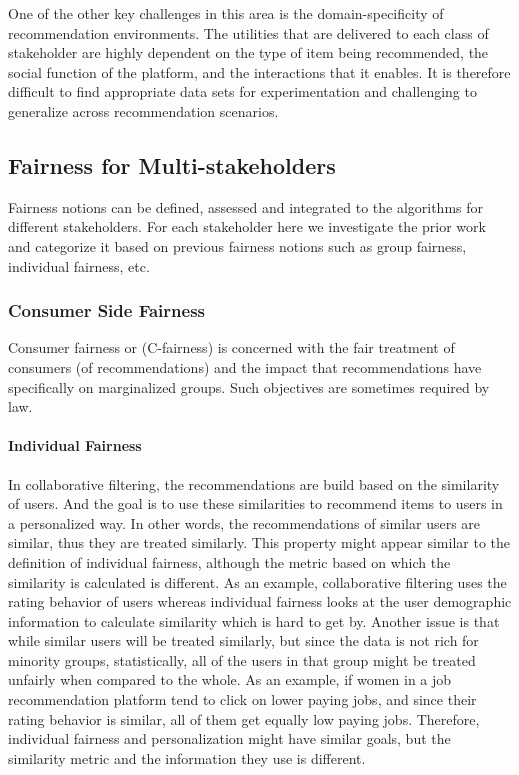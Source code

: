 One of the other key challenges in this area is the domain-specificity of recommendation environments. The utilities that are delivered to each class of stakeholder are highly dependent on the type of item being recommended, the social function of the platform, and the interactions that it enables. It is therefore difficult to find appropriate data sets for experimentation and challenging to generalize across recommendation scenarios.

\subsection{Fairness for Multi-stakeholders}
Fairness notions can be defined, assessed and integrated to the algorithms for different stakeholders. For each stakeholder here we investigate the prior work and categorize it based on previous fairness notions such as group fairness, individual fairness, etc.

\subsubsection{Consumer Side Fairness}
Consumer fairness or (C-fairness) is concerned with the fair treatment of consumers (of recommendations) and the impact that recommendations have specifically on marginalized groups. Such objectives are sometimes required by law.
    
\paragraph{Individual Fairness}
In collaborative filtering, the recommendations are build based on the similarity of users. And the goal is to use these similarities to recommend items to users in a personalized way. In other words, the recommendations of similar users are similar, thus they are treated similarly. This property might appear similar to the definition of individual fairness, although the metric based on which the similarity is calculated is different. As an example,
collaborative filtering uses the rating behavior of users whereas individual fairness looks at the user demographic information to calculate similarity which is hard to get by.
Another issue is that while similar users will be treated similarly, but since the data is not rich for minority groups, statistically, all of the users in that group might be treated unfairly when compared to the whole.
As an example, if women in a job recommendation platform tend to click on lower paying jobs, and since their rating behavior is similar, all of them get equally low paying jobs. Therefore, individual fairness and personalization might have similar goals, but the similarity metric and the information they use is different.


